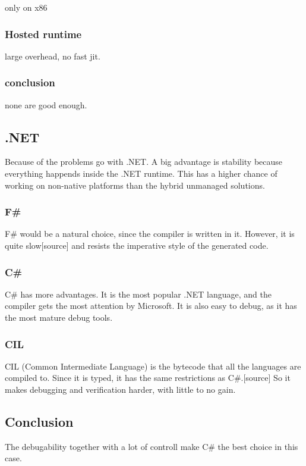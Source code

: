 only on x86\cite{mono_c++cli}

\subsubsection*{Hosted runtime}
large overhead, no fast jit.

\subsubsection*{conclusion}
none are good enough.


\subsection{.NET}
Because of the problems go with .NET.
A big advantage is stability because everything happends inside the .NET runtime.
This has a higher chance of working on non-native platforms than the hybrid unmanaged solutions.

\subsubsection*{F\#}
F\# would be a natural choice, since the compiler is written in it.
However, it is quite slow[source] and resists the imperative style of the generated code.

\subsubsection*{C\#}
C\# has more advantages.
It is the most popular .NET language, and the compiler gets the most attention by Microsoft.
It is also easy to debug, as it has the most mature debug tools.

\subsubsection*{CIL}
CIL (Common Intermediate Language) is the bytecode that all the languages are compiled to.
Since it is typed, it has the same restrictions as C\#.[source]
So it makes debugging and verification harder, with little to no gain.

\subsection{Conclusion}
The debugability together with a lot of controll make C\# the best choice in this case.
